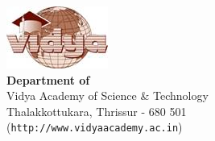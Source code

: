 %
\newpage
\thispagestyle{empty}
\vspace*{\fill}
\begin{flushright}
\includegraphics{VidyaLogo.JPG}\\[0.5cm]
{\Large \bf \sf  Department of \vdept\ }\\
{\sf Vidya Academy of Science \& Technology\\
Thalakkottukara, Thrissur - 680 501\\
({\tt http://www.vidyaacademy.ac.in})}
\end{flushright}
%